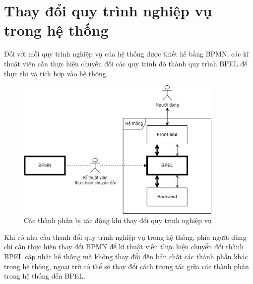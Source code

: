 \section{Thay đổi quy trình nghiệp vụ trong hệ thống}



\hspace*{0.5cm}Đối với mỗi quy trình nghiệp vụ của hệ thống được thiết kế bằng BPMN, các kĩ thuật viên cần thực hiện chuyền đổi các quy trình đó thành quy trình BPEL để thực thi và tích hợp vào hệ thông.

\begin{figure}[!htp]
    \centering
    \includegraphics[width=10cm]{img/bpel/tranfer.png}
    \newline
    \caption{Các thành phần bị tác động khi thay đổi quy trịnh nghiệp vụ}
\end{figure}

Khi có nhu cầu thanh đổi quy trình nghiệp vụ trong hệ thống, phía người dùng chỉ cần thực hiện thay đổi BPMN để kĩ thuật viên thực hiện chuyển đổi thành BPEL cập nhật hệ thống mà không thay đổi đến bản chất các thành phần khác trong hệ thông, ngoại trừ có thể sẽ thay đổi cách tương tác giửa các thành phần trong hệ thống đến BPEL.
